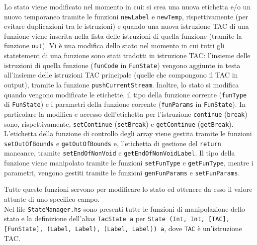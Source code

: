 Lo stato viene modificato nel momento in cui: si crea una nuova etichetta e/o un nuovo temporaneo tramite le funzioni {\tt newLabel} e {\tt newTemp}, rispettivamente (per evitare duplicazioni tra le istruzioni) e quando una nuova istruzione TAC di una funzione viene inserita nella lista delle istruzioni di quella funzione (tramite la funzione {\tt out}). Vi è una modifica dello stato nel momento in cui tutti gli statetement di una funzione sono stati tradotti in istruzione TAC: l'insieme delle istruzioni di quella funzione ({\tt funCode} in {\tt FunState}) vengono aggiunte in testa all'insieme delle istruzioni TAC principale (quelle che compongono il TAC in output), tramite la funzione {\tt pushCurrentStream}.
Inoltre, lo stato si modifica quando vengono modificate le etichette, il tipo della funzione corrente ({\tt funType} di {\tt FunState}) e i parametri della funzione corrente ({\tt funParams} in {\tt FunState}). In particolare la modifica e accesso dell'etichetta per l'istruzione {\tt continue} ({\tt break}) sono, rispettivamente, {\tt setContinue} ({\tt setBreak}) e {\tt getContinue} ({\tt getBreak}). L'etichetta della funzione di controllo degli array viene gestita tramite le funzioni {\tt setOutOfBounds} e {\tt getOutOfBounds} e, l'etichetta di gestione del {\tt return} mancance, tramite {\tt setEndOfNonVoid} e {\tt getEndOfNonVoidLabel}. Il tipo della funzione viene manipolato tramite le funzioni {\tt setFunType} e {\tt getFunType}, mentre i parametri, vengono gestiti tramite le funzioni {\tt genFunParams} e {\tt setFunParams}.

Tutte queste funzioni servono per modificare lo stato ed ottenere da esso il valore attuate di uno specifico campo.\\

Nel file {\tt StateManager.hs} sono presenti tutte le funzioni di manipolazione dello stato e la definizione dell'alias {\tt TacState a} per {\tt State (Int, Int, [TAC], [FunState], (Label, Label), (Label, Label)) a}, dove {\tt TAC} è un'istruzione TAC.